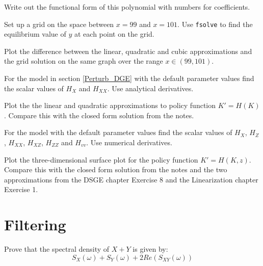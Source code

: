 \documentclass[letterpaper,11pt]{article}
\theoremstyle{definition}
\begin{document}
\begin{spacing}{1.5}
\begin{Exercise}
		Write out the functional form of this polynomial with numbers for coefficients.

		Set up a grid on the space between $x=99$ and $x=101$. Use {\tt fsolve} to find the equilibrium value of $y$ at each point on the grid.

		Plot the difference between the linear, quadratic and cubic approximations and the grid solution on the same graph over the range $x\in(99,101)$.
	\end{Exercise}

	\begin{Exercise} \label{Perturb_HW_BM_NoStoch}
		For the \citet{BrockMirman1972} model in section \ref{Perturb_DGE} with the default parameter values find the scalar values of $H_X$ and $H_{XX}$.  Use analytical derivatives.

		Plot the the linear and quadratic approximations to policy function $K' = H(K)$.  Compare this with the closed form solution from the notes.
	\end{Exercise}

	\begin{Exercise} \label{Perturb_HW_BM}
		For the \citet{BrockMirman1972} model with the default parameter values find the scalar values of $H_X$, $H_Z$, $H_{XX}$, $H_{XZ}$, $H_{ZZ}$ and $H_{vv}$.  Use numerical derivatives.

		Plot the three-dimensional surface plot for the policy function $K' = H(K,z)$.  Compare this with the closed form solution from the notes and the two approximations from the DSGE chapter Exercise 8 and the Linearization chapter Exercise 1.
	\end{Exercise}



\section*{Filtering}\label{Filter_HW}
\setcounter{Exercise}{0}
    \begin{Exercise} \label{Filter_HW_CoVar_Proof}
        Prove that the spectral density of $X+Y$ is given by:
        $$S_X(\omega) + S_Y(\omega) + 2 Re(S_{XY}(\omega))$$
    \end{Exercise}


\end{spacing}
\end{document}
